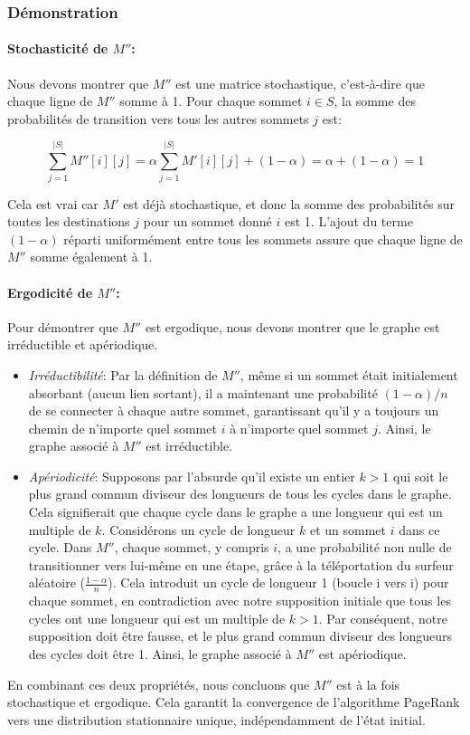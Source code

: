 \subsubsection{Démonstration}

\paragraph{Stochasticité de $M''$:} Nous devons montrer que $M''$ est une matrice stochastique, c'est-à-dire que chaque ligne de $M''$ somme à 1. Pour chaque sommet $i \in S$, la somme des probabilités de transition vers tous les autres sommets $j$ est:

\[
\sum_{j=1}^{|S|} M''[i][j] = \alpha \sum_{j=1}^{|S|} M'[i][j] + (1-\alpha) = \alpha + (1-\alpha) = 1
\]

Cela est vrai car $M'$ est déjà stochastique, et donc la somme des probabilités sur toutes les destinations $j$ pour un sommet donné $i$ est 1. L'ajout du terme $(1-\alpha)$ réparti uniformément entre tous les sommets assure que chaque ligne de $M''$ somme également à 1.

\paragraph{Ergodicité de $M''$:} Pour démontrer que $M''$ est ergodique, nous devons montrer que le graphe est irréductible et apériodique.

\begin{itemize}
    \item \textit{Irréductibilité}: Par la définition de $M''$, même si un sommet était initialement absorbant (aucun lien sortant), il a maintenant une probabilité $(1-\alpha)/n$ de se connecter à chaque autre sommet, garantissant qu'il y a toujours un chemin de n'importe quel sommet $i$ à n'importe quel sommet $j$. Ainsi, le graphe associé à $M''$ est irréductible.
    
    \item \textit{Apériodicité}: Supposons par l'absurde qu'il existe un entier $k > 1$ qui soit le plus grand commun diviseur des longueurs de tous les cycles dans le graphe. Cela signifierait que chaque cycle dans le graphe a une longueur qui est un multiple de $k$. Considérons un cycle de longueur $k$ et un sommet $i$ dans ce cycle. Dans $M''$, chaque sommet, y compris $i$, a une probabilité non nulle de transitionner vers lui-même en une étape, grâce à la téléportation du surfeur aléatoire ($\frac{1-\alpha}{n}$). Cela introduit un cycle de longueur 1 (boucle i vers i) pour chaque sommet, en contradiction avec notre supposition initiale que tous les cycles ont une longueur qui est un multiple de $k > 1$. Par conséquent, notre supposition doit être fausse, et le plus grand commun diviseur des longueurs des cycles doit être 1. Ainsi, le graphe associé à $M''$ est apériodique.

\end{itemize}

En combinant ces deux propriétés, nous concluons que $M''$ est à la fois stochastique et ergodique. Cela garantit la convergence de l'algorithme PageRank vers une distribution stationnaire unique, indépendamment de l'état initial.

